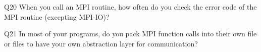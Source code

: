 \begin{description}%
\item{Q20} When you call an MPI routine, how often do you check the error code of the MPI routine  (excepting MPI-IO)?%
\item{Q21} In most of your programs, do you pack MPI function calls into their own file or files to have your own abstraction layer for communication?%
\end{description}%
